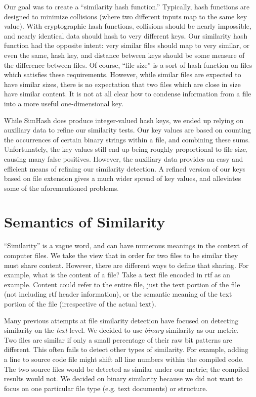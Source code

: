 \documentclass[10pt, twocolumn]{article}
\begin{document}
Our goal was to create a ``similarity hash function.''  Typically, hash functions are designed to minimize collisions (where two different inputs map to the same key value).  With cryptographic hash functions, collisions should be nearly impossible, and nearly identical data should hash to very different keys.  Our similarity hash function had the opposite intent: very similar files should map to very similar, or even the same, hash key, and distance between keys should be some measure of the difference between files.  Of course, ``file size'' is a sort of hash function on files which satisfies these requirements.  However, while similar files are expected to have similar sizes, there is no expectation that two files which are close in size have similar content.  It is not at all clear how to condense information from a file into a more useful one-dimensional key.

While SimHash does produce integer-valued hash keys, we ended up relying on auxiliary data to refine our similarity tests.  Our key values are based on counting the occurrences of certain binary strings within a file, and combining these sums.  Unfortunately, the key values still end up being roughly proportional to file size, causing many false positives.  However, the auxiliary data provides an easy and efficient means of refining our similarity detection.  A refined version of our keys based on file extension gives a much wider spread of key values, and alleviates some of the aforementioned problems.


\section{Semantics of Similarity}

``Similarity'' is a vague word, and can have numerous meanings in the context of computer files. We take the view that in order for two files to be similar they must share content. However, there are different ways to define that sharing. For example, what is the content of a file? Take a text file encoded in rtf as an example. Content could refer to the entire file, just the text portion of the file (not including rtf header information), or the semantic meaning of the text portion of the file (irrespective of the actual text). 

Many previous attempts at file similarity detection have focused on detecting similarity on the \emph{text} \cite{hpDocRepositories, hoad} level. We decided to use \emph{binary} similarity as our metric. Two files are similar if only a small percentage of their raw bit patterns are different. This often fails to detect other types of similarity.  For example, adding a line to source code file might shift all line numbers within the compiled code.  The two source files would be detected as similar under our metric; the compiled results would not.  We decided on binary similarity because we did not want to focus on one particular file type (e.g. text documents) or structure. 
\end{document}
